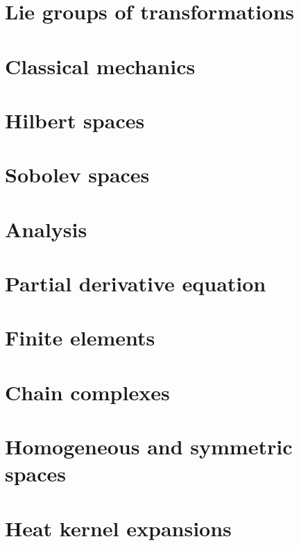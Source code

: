 \documentclass[a4paper,twoside,11pt]{book}
\begin{document}
\chapter{Lie groups of transformations}


\chapter{Classical mechanics}


\chapter{Hilbert spaces}



\chapter{Sobolev spaces}


\chapter{Analysis}




\chapter{Partial derivative equation}


\chapter{Finite elements}


\chapter{Chain complexes}


\chapter{Homogeneous and symmetric spaces}




\chapter{Heat kernel expansions}

\end{document}
